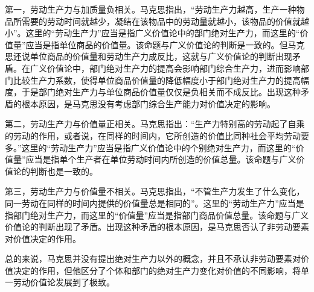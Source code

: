 第一，劳动生产力与加质量负相关。马克思指出，“劳动生产力越高，生产一种物品所需要的劳动时间就越少，凝结在该物品中的劳动量就越小，该物品的价值就越小”\cite[53]{ZhongGongZhongYangMaKeSiEnGeSiLieNingSiDaLinZhuZuoBianYiJuMaKeSiEnGeSiWenJiDi5Juan2009}。这里的“劳动生产力”应当是指广义价值论中的部门绝对生产力，而这里的“价值量”应当是指单位商品的价值量\cite[273]{CaiJiMingCongGuDianZhengZhiJingJiXueDaoZhongGuoTeSeSheHuiZhuYiZhengZhiJingJiXueJiYuZhongGuoShiJiaoDeZhengZhiJingJiXueYanBianShangCe2023}。该命题与广义价值论的判断是一致的。但马克思还说单位商品的价值量和劳动生产力成反比\cite[53-54]{ZhongGongZhongYangMaKeSiEnGeSiLieNingSiDaLinZhuZuoBianYiJuMaKeSiEnGeSiWenJiDi5Juan2009}，这就与广义价值论的判断出现矛盾。在广义价值论中，部门绝对生产力的提高会影响部门综合生产力，进而影响部门比较生产力系数，使得单位商品价值量的降低幅度小于部门绝对生产力的提高幅度，于是部门绝对生产力与单位商品价值量仅仅是负相关而不成反比\cite[274, 282]{CaiJiMingCongGuDianZhengZhiJingJiXueDaoZhongGuoTeSeSheHuiZhuYiZhengZhiJingJiXueJiYuZhongGuoShiJiaoDeZhengZhiJingJiXueYanBianShangCe2023}。出现这种矛盾的根本原因，是马克思没有考虑部门综合生产能力对价值决定的影响。

第二，劳动生产力与价值量正相关。马克思指出：“生产力特别高的劳动起了自乘的劳动的作用，或者说，在同样的时间内，它所创造的价值比同种社会平均劳动要多。”\cite[370]{ZhongGongZhongYangMaKeSiEnGeSiLieNingSiDaLinZhuZuoBianYiJuMaKeSiEnGeSiWenJiDi5Juan2009}这里的“劳动生产力”应当是指广义价值论中的个别绝对生产力，而这里的“价值量”应当是指单个生产者在单位劳动时间内所创造的价值总量\cite[273]{CaiJiMingCongGuDianZhengZhiJingJiXueDaoZhongGuoTeSeSheHuiZhuYiZhengZhiJingJiXueJiYuZhongGuoShiJiaoDeZhengZhiJingJiXueYanBianShangCe2023}。该命题与广义价值论的判断也是一致的。

第三，劳动生产力与价值量不相关。马克思指出，“不管生产力发生了什么变化，同一劳动在同样的时间内提供的价值量总是相同的”\cite[60]{ZhongGongZhongYangMaKeSiEnGeSiLieNingSiDaLinZhuZuoBianYiJuMaKeSiEnGeSiWenJiDi5Juan2009}。这里的“劳动生产力”应当是指部门绝对生产力，而这里的“价值量”应当是指部门商品价值总量\cite[274]{CaiJiMingCongGuDianZhengZhiJingJiXueDaoZhongGuoTeSeSheHuiZhuYiZhengZhiJingJiXueJiYuZhongGuoShiJiaoDeZhengZhiJingJiXueYanBianShangCe2023}。该命题与广义价值论的判断出现了矛盾。出现这种矛盾的根本原因，是马克思否认了非劳动要素对价值决定的作用\cite[274]{CaiJiMingCongGuDianZhengZhiJingJiXueDaoZhongGuoTeSeSheHuiZhuYiZhengZhiJingJiXueJiYuZhongGuoShiJiaoDeZhengZhiJingJiXueYanBianShangCe2023}。

总的来说，马克思并没有提出绝对生产力以外的概念，并且不承认非劳动要素对价值决定的作用，但他区分了个体和部门的绝对生产力变化对价值的不同影响，将单一劳动价值论发展到了极致。

